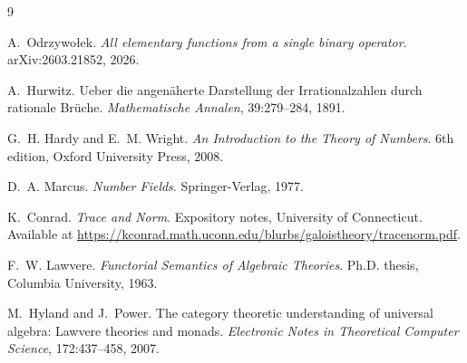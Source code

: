\documentclass[11pt]{article}
\begin{document}
\begin{thebibliography}{9}

A.~Odrzywo\l{}ek.
\newblock \emph{All elementary functions from a single binary operator}.
\newblock arXiv:2603.21852, 2026.

A.~Hurwitz.
\newblock Ueber die angenäherte Darstellung der Irrationalzahlen durch rationale Brüche.
\newblock \emph{Mathematische Annalen}, 39:279--284, 1891.

G.~H. Hardy and E.~M. Wright.
\newblock \emph{An Introduction to the Theory of Numbers}.
\newblock 6th edition, Oxford University Press, 2008.

D.~A. Marcus.
\newblock \emph{Number Fields}.
\newblock Springer-Verlag, 1977.

K.~Conrad.
\newblock \emph{Trace and Norm}.
\newblock Expository notes, University of Connecticut. Available at \url{https://kconrad.math.uconn.edu/blurbs/galoistheory/tracenorm.pdf}.

F.~W. Lawvere.
\newblock \emph{Functorial Semantics of Algebraic Theories}.
\newblock Ph.D. thesis, Columbia University, 1963.

M.~Hyland and J.~Power.
\newblock The category theoretic understanding of universal algebra: Lawvere theories and monads.
\newblock \emph{Electronic Notes in Theoretical Computer Science}, 172:437--458, 2007.

\end{thebibliography}
\end{document}
